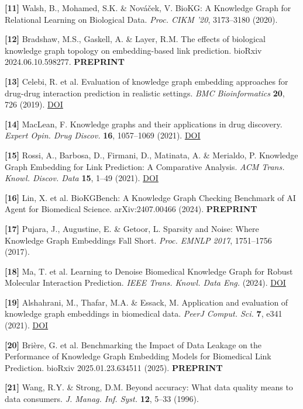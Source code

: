 \textbf{{[}11{]}} Walsh, B., Mohamed, S.K. \& Nováček, V. BioKG: A Knowledge Graph for Relational Learning on Biological Data. \emph{Proc. CIKM '20}, 3173--3180 (2020).

\textbf{{[}12{]}} Bradshaw, M.S., Gaskell, A. \& Layer, R.M. The effects of biological knowledge graph topology on embedding-based link prediction. bioRxiv 2024.06.10.598277. \textbf{PREPRINT}

\textbf{{[}13{]}} Celebi, R. et al. Evaluation of knowledge graph embedding approaches for drug-drug interaction prediction in realistic settings. \emph{BMC Bioinformatics} \textbf{20}, 726 (2019). \href{https://doi.org/10.1186/s12859-019-3284-5}{DOI}

\textbf{{[}14{]}} MacLean, F. Knowledge graphs and their applications in drug discovery. \emph{Expert Opin. Drug Discov.} \textbf{16}, 1057--1069 (2021). \href{https://doi.org/10.1080/17460441.2021.1910673}{DOI}

\textbf{{[}15{]}} Rossi, A., Barbosa, D., Firmani, D., Matinata, A. \& Merialdo, P. Knowledge Graph Embedding for Link Prediction: A Comparative Analysis. \emph{ACM Trans. Knowl. Discov. Data} \textbf{15}, 1--49 (2021). \href{https://doi.org/10.1145/3424672}{DOI}

\textbf{{[}16{]}} Lin, X. et al. BioKGBench: A Knowledge Graph Checking Benchmark of AI Agent for Biomedical Science. arXiv:2407.00466 (2024). \textbf{PREPRINT}

\textbf{{[}17{]}} Pujara, J., Augustine, E. \& Getoor, L. Sparsity and Noise: Where Knowledge Graph Embeddings Fall Short. \emph{Proc. EMNLP 2017}, 1751--1756 (2017).

\textbf{{[}18{]}} Ma, T. et al. Learning to Denoise Biomedical Knowledge Graph for Robust Molecular Interaction Prediction. \emph{IEEE Trans. Knowl. Data Eng.} (2024). \href{https://doi.org/10.1109/TKDE.2024.3471508}{DOI}

\textbf{{[}19{]}} Alshahrani, M., Thafar, M.A. \& Essack, M. Application and evaluation of knowledge graph embeddings in biomedical data. \emph{PeerJ Comput. Sci.} \textbf{7}, e341 (2021). \href{https://doi.org/10.7717/peerj-cs.341}{DOI}

\textbf{{[}20{]}} Brière, G. et al. Benchmarking the Impact of Data Leakage on the Performance of Knowledge Graph Embedding Models for Biomedical Link Prediction. bioRxiv 2025.01.23.634511 (2025). \textbf{PREPRINT}

\textbf{{[}21{]}} Wang, R.Y. \& Strong, D.M. Beyond accuracy: What data quality means to data consumers. \emph{J. Manag. Inf. Syst.} \textbf{12}, 5--33 (1996).

